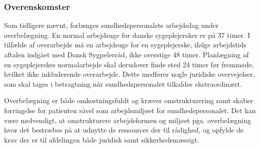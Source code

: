 \subsubsection{Overenskomster}
Som tidligere nævnt, forlænges sundhedspersonalets arbejdsdag under overbelægning. En normal arbejdsuge for danske sygeplejersker er på 37 timer. I tilfælde af overarbejde må en arbejdsuge for en sygeplejerske, ifølge arbejdstids aftalen indgået med Dansk Sygpelerråd, ikke overstige 48 timer. Planlægning af en sygeplejerskes normalarbejde skal derudover finde sted 24 timer før fremmøde, hvilket ikke inkluderende overarbejde. \cite{Danske2015}  Dette medfører nogle juridiske overvejelser, som skal tages i betragtning når sundhedspersonalet tilkaldes ekstraordinært. 

\noindent
{}
Overbelægning er både omkostningsfuldt og kræver omstrukturering samt skaber forringelse for patienten såvel som arbejdsmiljøet for sundhedspersonalet. Det kan være nødvendigt, at omstrukturere arbejdsformen og miljøet pga.  overbelægning hvor det bestræbes på at udnytte de ressourcer der til rådighed, og opfylde de krav der er til afdelingen både juridisk samt sikkerhedsmæssigt. 
